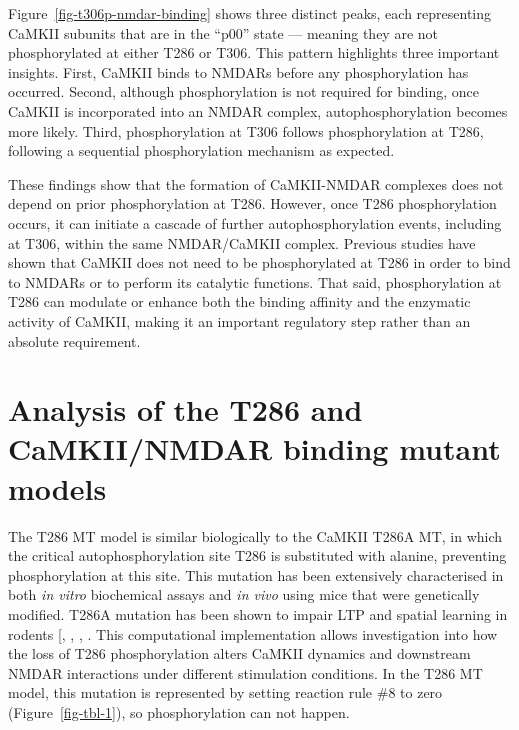 \documentclass[
  11pt,
  letterpaper,
]{scrreprt}
\begin{document}
Figure~\ref{fig-t306p-nmdar-binding} shows three distinct peaks, each
representing CaMKII subunits that are in the ``p00'' state --- meaning
they are not phosphorylated at either T286 or T306. This pattern
highlights three important insights. First, CaMKII binds to NMDARs
before any phosphorylation has occurred. Second, although
phosphorylation is not required for binding, once CaMKII is incorporated
into an NMDAR complex, autophosphorylation becomes more likely. Third,
phosphorylation at T306 follows phosphorylation at T286, following a
sequential phosphorylation mechanism as expected.

These findings show that the formation of CaMKII-NMDAR complexes does
not depend on prior phosphorylation at T286. However, once T286
phosphorylation occurs, it can initiate a cascade of further
autophosphorylation events, including at T306, within the same
NMDAR/CaMKII complex. Previous studies have shown that CaMKII does not
need to be phosphorylated at T286 in order to bind to NMDARs or to
perform its catalytic functions. That said, phosphorylation at T286 can
modulate or enhance both the binding affinity and the enzymatic activity
of CaMKII, making it an important regulatory step rather than an
absolute requirement.

\section{Analysis of the T286 and CaMKII/NMDAR binding mutant
models}\label{analysis-of-the-t286-and-camkiinmdar-binding-mutant-models}

The T286 MT model is similar biologically to the CaMKII T286A MT, in
which the critical autophosphorylation site T286 is substituted with
alanine, preventing phosphorylation at this site. This mutation has been
extensively characterised in both \emph{in vitro} biochemical assays and
\emph{in vivo} using mice that were genetically modified. T286A mutation
has been shown to impair LTP and spatial learning in rodents
{[},
,
,
\citeproc{ref-lou1986Activation}{467}{]}. This computational
implementation allows investigation into how the loss of T286
phosphorylation alters CaMKII dynamics and downstream NMDAR interactions
under different stimulation conditions. In the T286 MT model, this
mutation is represented by setting reaction rule \#8 to zero
(Figure~\ref{fig-tbl-1}), so phosphorylation can not happen.
\end{document}
